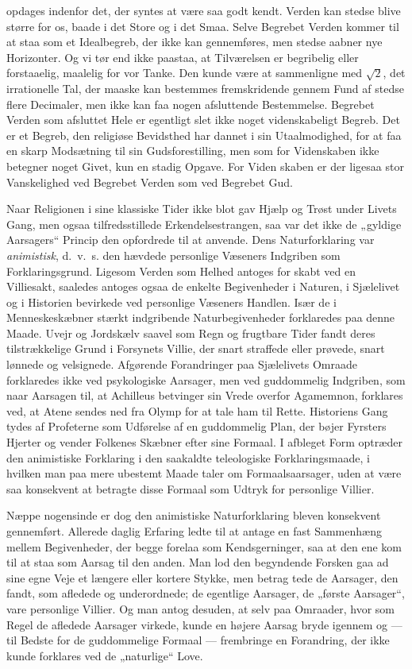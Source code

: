 \documentclass[12pt,a4paper]{article}
\newcommand{\opage}[1]{\marginnote{\footnotesize\textit{[#1]}}}
\begin{document}
opdages indenfor det, der syntes at være saa godt kendt. Verden kan stedse
blive større for os, baade i det Store og i det Smaa. Selve Begrebet Verden
kommer til at staa som et Idealbegreb, der ikke kan gennemføres, men stedse
aabner nye Horizonter. Og vi tør end ikke paastaa, at Tilværelsen er
begribelig eller forstaaelig, maalelig for vor Tanke. Den kunde være at
sammenligne med $\sqrt{2}$, det irrationelle Tal, der maaske kan bestemmes
fremskridende gennem Fund af stedse flere Decimaler, men ikke kan faa nogen
afsluttende Bestemmelse. Begrebet Verden som afsluttet Hele er egentligt slet
ikke noget videnskabeligt Begreb. Det er et Begreb, den religiøse Bevidsthed
har dannet i sin Utaalmodighed, for at faa en skarp Modsætning til sin
Gudsforestilling, men som for Videnskaben ikke betegner noget Givet, kun en
stadig Opgave. For Viden%
\opage{20}skaben er der ligesaa stor Vanskelighed ved Begrebet
Verden som ved Begrebet Gud.

Naar Religionen i sine klassiske Tider ikke blot gav Hjælp og Trøst under
Livets Gang, men ogsaa tilfredsstillede Erkendelsestrangen, saa var det ikke
de „gyldige Aarsagers“ Princip den opfordrede til at anvende. Dens
Naturforklaring var \emph{animistisk}, d.\ v.\ s. den hævdede personlige
Væseners Indgriben som Forklaringsgrund. Ligesom Verden som Helhed antoges
for skabt ved en Villiesakt, saaledes antoges ogsaa de enkelte Begivenheder
i Naturen, i Sjælelivet og i Historien bevirkede ved personlige Væseners
Handlen. Især de i Menneskeskæbner stærkt indgribende Naturbegivenheder
forklaredes paa denne Maade. Uvejr og Jordskælv saavel som Regn og frugtbare
Tider fandt deres tilstrækkelige Grund i Forsynets Villie, der snart
straffede eller prøvede, snart lønnede og velsignede. Afgørende Forandringer
paa Sjælelivets Omraade forklaredes ikke ved psykologiske Aarsager, men ved
guddommelig Indgriben, som naar Aarsagen til, at Achilleus betvinger sin
Vrede overfor Agamemnon, forklares ved, at Atene sendes ned fra Olymp for at
tale ham til Rette. Historiens Gang tydes af Profeterne som Udførelse af en
guddommelig Plan, der bøjer Fyrsters Hjerter og vender Folkenes Skæbner efter
sine Formaal. I afbleget Form optræder den animistiske Forklaring i den
saakaldte teleologiske Forklaringsmaade, i hvilken man paa mere ubestemt
Maade taler om Formaalsaarsager, uden at være saa konsekvent at betragte
disse Formaal som Udtryk for personlige Villier.

Næppe nogensinde er dog den animistiske Naturforklaring bleven konsekvent
gennemført. Allerede daglig Erfaring ledte til at antage en fast Sammenhæng
mellem Begivenheder, der begge forelaa som Kendsgerninger, saa at den ene
kom til at staa som Aarsag til den anden. Man lod den begyndende Forsken gaa
ad sine egne Veje et længere eller kortere Stykke, men betrag%
\opage{21}tede de
Aarsager, den fandt, som afledede og underordnede; de egentlige Aarsager,
de „første Aarsager“, vare personlige Villier. Og man antog desuden, at
selv paa Omraader, hvor som Regel de afledede Aarsager virkede, kunde en
højere Aarsag bryde igennem og --- til Bedste for de guddommelige Formaal
--- frembringe en Forandring, der ikke kunde forklares ved de „naturlige“
Love.
\end{document}
